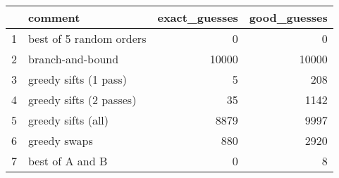 \begin{table}[ht]
\centering
\begin{tabular}{rlrr}
  \hline
 & comment & exact\_guesses & good\_guesses \\ 
  \hline
1 & best of 5 random orders &   0 &   0 \\ 
  2 & branch-and-bound & 10000 & 10000 \\ 
  3 & greedy sifts (1 pass) &   5 & 208 \\ 
  4 & greedy sifts (2 passes) &  35 & 1142 \\ 
  5 & greedy sifts (all) & 8879 & 9997 \\ 
  6 & greedy swaps & 880 & 2920 \\ 
  7 & best of A and B &   0 &   8 \\ 
   \hline
\end{tabular}
\end{table}
